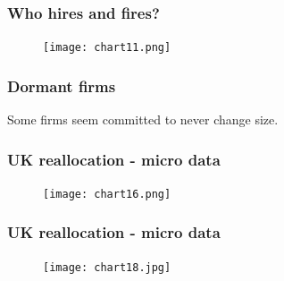 \documentclass{beamer}
\begin{document}
\begin{frame}
\frametitle{Who hires and fires?}


\begin{figure}
\centering
\texttt{[image: chart11.png]}
\end{figure}

\end{frame}


\begin{frame}
\frametitle{Dormant firms}

Some firms seem committed to never change size.


\end{frame}


\begin{frame}
\frametitle{UK reallocation - micro data}


\begin{figure}
\centering
\texttt{[image: chart16.png]}
\end{figure}

\end{frame}

\begin{frame}
\frametitle{UK reallocation - micro data}


\begin{figure}
\centering
\texttt{[image: chart18.jpg]}
\end{figure}

\end{frame}
\end{document}
